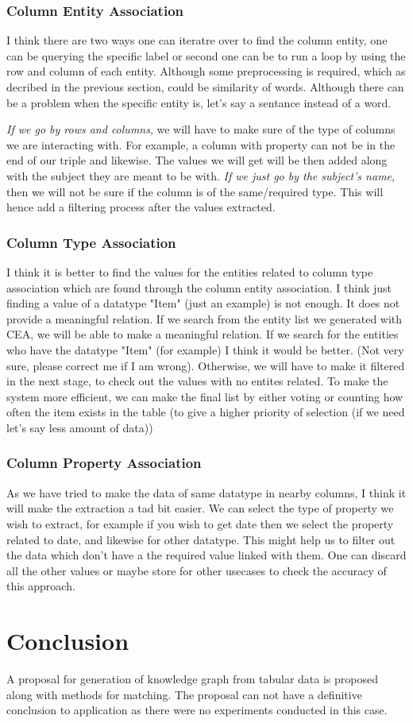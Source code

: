 \documentclass[runningheads]{llncs}
\begin{document}
\subsubsection*{Column Entity Association}
I think there are two ways one can iteratre over to find the column entity, one can be querying the specific label or second one can be to 
run a loop by using the row and column of each entity. Although some preprocessing is required, which as decribed in the previous section,
could be similarity of words. Although there can be a problem when the specific entity is, let's say a sentance instead of a word.

\textit{If we go by rows and columns}, we will have to make sure of the type of columns we are interacting with. For example, a column with property can
not be in the end of our triple and likewise. The values we will get will be then added along with the subject they are meant to be with. 
\textit{If we just go by the subject's name}, then we will not be sure if the column is of the same/required type. This will hence add a filtering 
process after the values extracted.

\subsubsection{Column Type Association}
I think it is better to find the values for the entities related to column type association which are found through the column entity association.
I think just finding a value of a datatype "Item" (just an example) is not enough. It does not provide a meaningful relation. If we search from 
the entity list we generated with CEA, we will be able to make a meaningful relation. If we search for the entities who have the datatype "Item"
(for example) I think it would be better. (Not very sure, please correct me if I am wrong). Otherwise, we will have to make it filtered in the next stage,
to check out the values with no entites related. To make the system more efficient, we can make the final list by either voting or counting how 
often the item exists in the table (to give a higher priority of selection (if we need let's say less amount of data)) 

\subsubsection*{Column Property Association}
As we have tried to make the data of same datatype in nearby columns, I think it will make the extraction a tad bit easier. We can select 
the type of property we wish to extract, for example if you wish to get date then we select the property related to date, and likewise for 
other datatype. This might help us to filter out the data which don't have a the required value linked with them. One can discard all the other
values or maybe store for other usecases to check the accuracy of this approach. 

\section{Conclusion}
A proposal for generation of knowledge graph from tabular data is proposed along with methods for matching. The proposal can not have a definitive conclusion
to application as there were no experiments conducted in this case.
\end{document}
